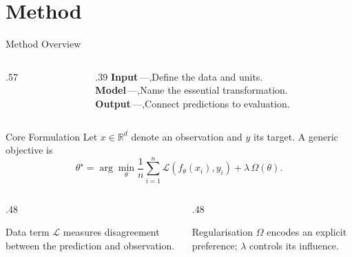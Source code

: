 \documentclass[aspectratio=169,11pt]{beamer}
\begin{document}
\section{Method}

\begin{frame}{Method Overview}
  \begin{columns}[c,onlytextwidth]
    \begin{column}{.57\textwidth}
      \centering
    \end{column}
    \begin{column}{.39\textwidth}
      \textbf{Input}\,---,Define the data and units.\\[6pt]
      \textbf{Model}\,---,Name the essential transformation.\\[6pt]
      \textbf{Output}\,---,Connect predictions to evaluation.
    \end{column}
  \end{columns}

  \vspace{0.55cm}
\end{frame}

\begin{frame}{Core Formulation}
  Let $x \in \mathbb{R}^{d}$ denote an observation and $y$ its target. A generic objective is
  \begin{equation*}
    \theta^{\star}=\arg\min_{\theta}\frac{1}{n}\sum_{i=1}^{n}
    \mathcal{L}\!\left(f_{\theta}(x_i),y_i\right)+\lambda\,\Omega(\theta).
  \end{equation*}

  \begin{columns}[T,onlytextwidth]
    \begin{column}{.48\textwidth}
      \begin{block}{Data term}
        $\mathcal{L}$ measures disagreement between the prediction and observation.
      \end{block}
    \end{column}
    \begin{column}{.48\textwidth}
      \begin{block}{Regularisation}
        $\Omega$ encodes an explicit preference; $\lambda$ controls its influence.
      \end{block}
    \end{column}
  \end{columns}
\end{frame}
\end{document}

